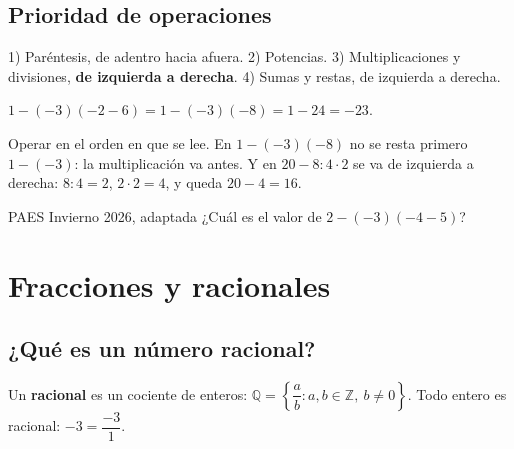 \subsection{Prioridad de operaciones}
\begin{clave}[Orden] 1) Paréntesis, de adentro hacia afuera. 2) Potencias. 3) Multiplicaciones y divisiones, \textbf{de izquierda a derecha}. 4) Sumas y restas, de izquierda a derecha.\end{clave}
\begin{ejemplo} $1 - (-3)(-2 - 6) = 1 - (-3)(-8) = 1 - 24 = -23$.\end{ejemplo}
\begin{ojo} Operar en el orden en que se lee. En $1 - (-3)(-8)$ no se resta primero $1 - (-3)$: la multiplicación va antes. Y en $20 - 8 : 4\cdot 2$ se va de izquierda a derecha: $8 : 4 = 2$, $2\cdot 2 = 4$, y queda $20 - 4 = 16$.\end{ojo}

\begin{elejemplo}{PAES Invierno 2026, adaptada}
¿Cuál es el valor de $2 - (-3)(-4 - 5)$?
\end{elejemplo}

\section{Fracciones y racionales}

\subsection{¿Qué es un número racional?}
Un \textbf{racional} es un cociente de enteros: $\mathbb{Q} = \left\{ \dfrac{a}{b} : a, b \in \mathbb{Z},\ b \neq 0 \right\}$. Todo entero es racional: $-3 = \dfrac{-3}{1}$.

